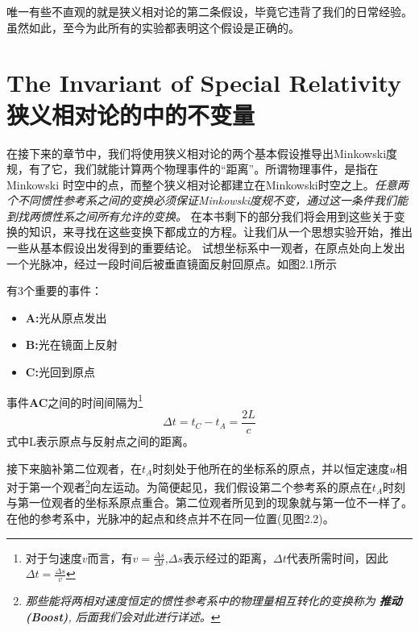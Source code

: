 唯一有些不直观的就是狭义相对论的第二条假设，毕竟它违背了我们的日常经验。虽然如此，至今为此所有的实验都表明这个假设是正确的。
\section[狭义相对论的中的不变量]{The Invariant of Special Relativity 狭义相对论的中的不变量}
\label{sec2.1}
在接下来的章节中，我们将使用狭义相对论的两个基本假设推导出Minkowski度规，有了它，我们就能计算两个物理事件的“距离”。所谓物理事件，是指在Minkowski 时空中的点，而整个狭义相对论都建立在Minkowski时空之上。{\it{任意两个不同惯性参考系之间的变换必须保证Minkowski度规不变，通过这一条件我们能到找两惯性系之间所有允许的变换。}}
在本书剩下的部分我们将会用到这些关于变换的知识，来寻找在这些变换下都成立的方程。让我们从一个思想实验开始，推出一些从基本假设出发得到的重要结论。
{}
试想坐标系中一观者，在原点处向上发出一个光脉冲，经过一段时间后被垂直镜面反射回原点。如图2.1所示

有3个重要的事件：
\begin{itemize}
  \item {\bf{A:}}光从原点发出
  \item {\bf{B:}}光在镜面上反射
  \item {\bf{C:}}光回到原点
\end{itemize}
事件{\bf{AC}}之间的时间间隔为\footnote{对于匀速度$v$而言，有$v=\frac{\Delta s}{\Delta t}$,$\Delta s$表示经过的距离，$\Delta t$代表所需时间，因此$\Delta t=\frac{\Delta s}{v}$}
\begin{equation}\label{eq2.1}
\Delta t=t_C-t_A=\frac{2L}{c}
\end{equation}
式中L表示原点与反射点之间的距离。

{}


接下来脑补第二位观者，在$t_A$时刻处于他所在的坐标系的原点，并以恒定速度$u$相对于第一个观者\footnote{\it{那些能将两相对速度恒定的惯性参考系中的物理量相互转化的变换称为
{\bf{推动(Boost)}}, 后面我们会对此进行详述。}}向左运动。为简便起见，我们假设第二个参考系的原点在$t_A$时刻与第一位观者的坐标系原点重合。第二位观者所见到的现象就与第一位不一样了。在他的参考系中，光脉冲的起点和终点并不在同一位置(见图2.2)。

